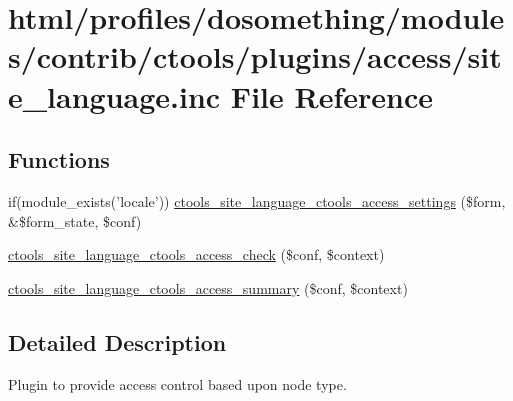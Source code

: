 \hypertarget{site__language_8inc}{
\section{html/profiles/dosomething/modules/contrib/ctools/plugins/access/site\_\-language.inc File Reference}
\label{site__language_8inc}
}
\subsection*{Functions}
\begin{DoxyCompactItemize}
\item 
if(module\_\-exists('locale')) \hyperlink{site__language_8inc_a4d93db692f7fd1be9ea8ca09b925a773}{ctools\_\-site\_\-language\_\-ctools\_\-access\_\-settings} (\$form, \&\$form\_\-state, \$conf)
\item 
\hyperlink{site__language_8inc_a91aa2e05cdc4966cd4827cb58416dba5}{ctools\_\-site\_\-language\_\-ctools\_\-access\_\-check} (\$conf, \$context)
\item 
\hyperlink{site__language_8inc_af4c58c89029a4c6801d2253815fd419e}{ctools\_\-site\_\-language\_\-ctools\_\-access\_\-summary} (\$conf, \$context)
\end{DoxyCompactItemize}


\subsection{Detailed Description}
Plugin to provide access control based upon node type. 

